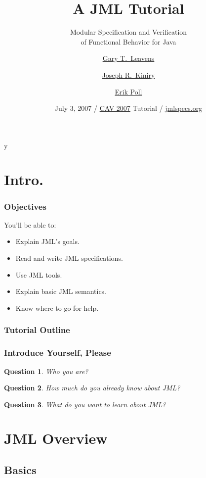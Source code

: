 \if y\MAKEHANDOUTS \documentclass[t,compress,landscape,handout]{beamer}
\title[JML Tutorial]{A JML Tutorial}
\subtitle{Modular Specification and Verification \\
of Functional Behavior for Java}
\author[Gary T. Leavens] %
{\href{http://www.cs.iastate.edu/~leavens/}{Gary T.~Leavens}\inst{1}
  \and \href{http://secure.ucd.ie/~kiniry/}{Joseph R.~Kiniry}\inst{2}
  \and \href{http://www.cs.ru.nl/~erikpoll/}{Erik Poll}\inst{3}}
\institute[ISU $\rightarrow$ UCF] %
{
  \inst{1}%
  Department of Computer Science\\
  \href{http://www.cs.iastate.edu/}{Iowa State University} (moving to \href{http://www.eecs.ucf.edu}{University of Central Florida})
  \and
  \inst{2}%
  School of Computer Science and Informatics \\
  \href{http://csiweb.ucd.ie/}{University College Dublin}
  \and
  \inst{3}%
  Computing Science Department \\
  \href{http://www.cs.ru.nl/}{Radboud University Nijmegen}
}
\date[CAV 2007]{July 3, 2007 / \href{http://cav2007.org/}{CAV 2007} Tutorial / \href{http://www.jmlspecs.org}{jmlspecs.org}}
\newtheorem*{question}{Question}
\begin{document}
\begin{frame}
  \titlepage
\end{frame}

\section*{Intro.}

\begin{frame}
\frametitle{Objectives}

You'll be able to:
  \begin{itemize}
  \item
    Explain JML's goals.
  \item
    Read and write JML specifications.
  \item
    Use JML tools.
  \item
    Explain basic JML semantics.
  \item
    Know where to go for help.
  \end{itemize}
\end{frame}

\begin{frame}
\frametitle{Tutorial Outline}
  \tableofcontents[hideallsubsections] %
\end{frame}

\begin{frame}
\frametitle{Introduce Yourself, Please}

\begin{question}
Who you are?
\end{question}

\begin{question}
How much do you already know about JML?
\end{question}

\begin{question}
What do you want to learn about JML?
\end{question}
\end{frame}


\section[Overview]{JML Overview}

\subsection[Basics]{Basics}
\end{document}
